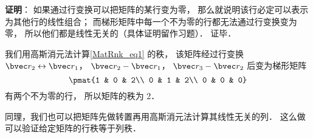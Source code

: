 \textbf{证明}： 如果通过行变换可以把矩阵的某行变为零， 那么就说明该行必定可以表示为其他行的线性组合； 而梯形矩阵中每一个不为零的行都无法通过行变换变为零， 所以他们都是线性无关的（具体证明留作习题）． 证毕．

\begin{example}{}
我们用高斯消元法计算\autoref{MatRnk_eq1} 的秩， 该矩阵经过行变换 $\bvec r_2 \leftrightarrow \bvec r_1$， $\bvec r_2 - \bvec r_1$， $\bvec r_3 - \bvec r_2$ 后变为梯形矩阵
\begin{equation}
\pmat{1 & 0 & 2\\ 0 & 1 & 2\\ 0 & 0 & 0}
\end{equation}
有两个不为零的行， 所以矩阵的秩为 2．
\end{example}

同理，我们也可以把矩阵先做转置再用高斯消元法计算其线性无关的列． 这么做可以验证给定矩阵的行秩等于列秩．
